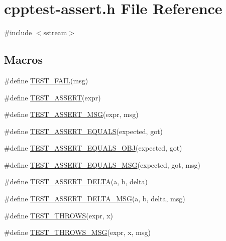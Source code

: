 \hypertarget{cpptest-assert_8h}{}\section{cpptest-\/assert.h File Reference}
\label{cpptest-assert_8h}
{\ttfamily \#include $<$sstream$>$}\newline
\subsection*{Macros}
\begin{DoxyCompactItemize}
\item 
\#define \mbox{\hyperlink{cpptest-assert_8h_a947ab44cc42369eb7cfe33f8a1e38e4b}{T\+E\+S\+T\+\_\+\+F\+A\+IL}}(msg)
\item 
\#define \mbox{\hyperlink{cpptest-assert_8h_a29a763f14098f5574ae5c68291dc6ddd}{T\+E\+S\+T\+\_\+\+A\+S\+S\+E\+RT}}(expr)
\item 
\#define \mbox{\hyperlink{cpptest-assert_8h_ac612ede938734f9c8d898e05818882fb}{T\+E\+S\+T\+\_\+\+A\+S\+S\+E\+R\+T\+\_\+\+M\+SG}}(expr,  msg)
\item 
\#define \mbox{\hyperlink{cpptest-assert_8h_ae281f4d973e657b11691a97551f17dd1}{T\+E\+S\+T\+\_\+\+A\+S\+S\+E\+R\+T\+\_\+\+E\+Q\+U\+A\+LS}}(expected,  got)
\item 
\#define \mbox{\hyperlink{cpptest-assert_8h_aa506d98e8a5fc575df0361906f7deef8}{T\+E\+S\+T\+\_\+\+A\+S\+S\+E\+R\+T\+\_\+\+E\+Q\+U\+A\+L\+S\+\_\+\+O\+BJ}}(expected,  got)
\item 
\#define \mbox{\hyperlink{cpptest-assert_8h_ab8e9ce729f96abe74b76d98f9568a59c}{T\+E\+S\+T\+\_\+\+A\+S\+S\+E\+R\+T\+\_\+\+E\+Q\+U\+A\+L\+S\+\_\+\+M\+SG}}(expected,  got,  msg)
\item 
\#define \mbox{\hyperlink{cpptest-assert_8h_a9583b1709f4b9dfb3ff2849bfec5c885}{T\+E\+S\+T\+\_\+\+A\+S\+S\+E\+R\+T\+\_\+\+D\+E\+L\+TA}}(a,  b,  delta)
\item 
\#define \mbox{\hyperlink{cpptest-assert_8h_afcd749452840bfde9be575ef22fcede0}{T\+E\+S\+T\+\_\+\+A\+S\+S\+E\+R\+T\+\_\+\+D\+E\+L\+T\+A\+\_\+\+M\+SG}}(a,  b,  delta,  msg)
\item 
\#define \mbox{\hyperlink{cpptest-assert_8h_a5174c5f93519d5726c8993b2f36d6ceb}{T\+E\+S\+T\+\_\+\+T\+H\+R\+O\+WS}}(expr,  x)
\item 
\#define \mbox{\hyperlink{cpptest-assert_8h_a1ce6abe9e9134ce993840a648673e0f2}{T\+E\+S\+T\+\_\+\+T\+H\+R\+O\+W\+S\+\_\+\+M\+SG}}(expr,  x,  msg)
\item 

\end{DoxyCompactItemize}
